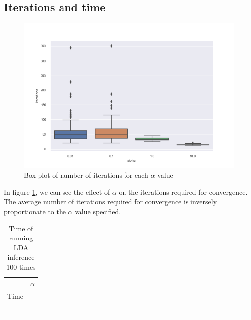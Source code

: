 \documentclass[a4paper]{article}
\begin{document}
	\subsection{Iterations and time}
	\begin{figure}[ht]
		\centering
		\includegraphics[width=0.8\linewidth]{images/iterations_boxplot.png}
		\caption{Box plot of number of iterations for each $\alpha$ value}
		\label{fig:boxplot}
	\end{figure}
	In figure \ref{fig:boxplot}, we can see the effect of $\alpha$ on the iterations required for convergence.
	The average number of iterations required for convergence is inversely proportionate to the $\alpha$ value specified.
	\begin{table}[ht]
		\centering
		\begin{tabular}{|l|l|}
		\hline
		 & $\alpha$ \\ Time \hline
		 &  \\ \hline
		 &  \\ \hline
		 &  \\ \hline 
		 &  \\ \hline
		 &  \\ \hline
		 \caption{Time of running LDA inference 100 times}
		\label{fig:time}
		\end{tabular}
	\end{table}
	\clearpage
	
	
\end{document}
